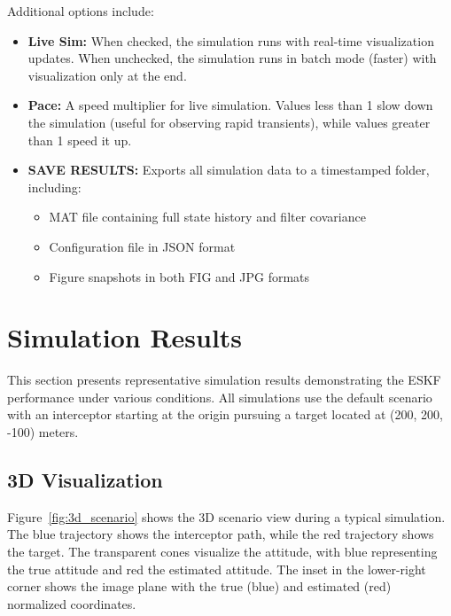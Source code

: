 \documentclass[11pt,a4paper]{article}
\begin{document}
Additional options include:
\begin{itemize}
    \item \textbf{Live Sim:} When checked, the simulation runs with real-time visualization updates. When unchecked, the simulation runs in batch mode (faster) with visualization only at the end.
    
    \item \textbf{Pace:} A speed multiplier for live simulation. Values less than 1 slow down the simulation (useful for observing rapid transients), while values greater than 1 speed it up.
    
    \item \textbf{SAVE RESULTS:} Exports all simulation data to a timestamped folder, including:
    \begin{itemize}
        \item MAT file containing full state history and filter covariance
        \item Configuration file in JSON format
        \item Figure snapshots in both FIG and JPG formats
    \end{itemize}
\end{itemize}

\section{Simulation Results}
\label{sec:results}

This section presents representative simulation results demonstrating the ESKF performance under various conditions. All simulations use the default scenario with an interceptor starting at the origin pursuing a target located at (200, 200, -100) meters.

\subsection{3D Visualization}

Figure~\ref{fig:3d_scenario} shows the 3D scenario view during a typical simulation. The blue trajectory shows the interceptor path, while the red trajectory shows the target. The transparent cones visualize the attitude, with blue representing the true attitude and red the estimated attitude. The inset in the lower-right corner shows the image plane with the true (blue) and estimated (red) normalized coordinates.
\end{document}

